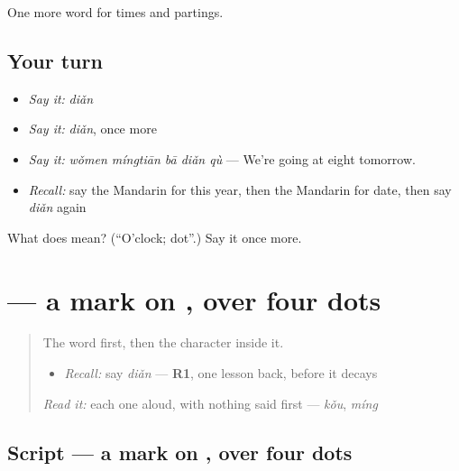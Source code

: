 \begin{grammarlens}[title={What you've built}]
One more word for times and partings.
\end{grammarlens}

\subsection*{Your turn}
\begin{itemize}
\raggedright
  \item \emph{Say it:} \emph{diǎn}
  \item \emph{Say it:} \emph{diǎn}, once more
  \item \emph{Say it:} \emph{wǒmen míngtiān bā diǎn qù} — We're going at eight tomorrow.
  \item \emph{Recall:} say the Mandarin for this year, then the Mandarin for date, then say \emph{diǎn} again
\end{itemize}

\begin{tcolorbox}[breakable,colback=teal!4,colframe=teal!35!black,title={Before you move on}]
What does  mean? (\textquotedblleft{}O'clock; dot\textquotedblright{}.) Say it once more.
\end{tcolorbox}
\section[\texorpdfstring{\zh{点} (diǎn)}{点 (diǎn)}]{ — a mark on , over four dots}

\label{lesson:ZH-W48-dian}



\begin{quote}
The word first, then the character inside it.

\begin{itemize}
\raggedright
  \item \emph{Recall:} say \emph{diǎn} — \textbf{R1}, one lesson back, before it decays
\end{itemize}

\begin{quote}
 
\end{quote}

\emph{Read it:} each one aloud, with nothing said first — \emph{kǒu}, \emph{míng}
\end{quote}

\subsection*{Script — a mark on , over four dots}


